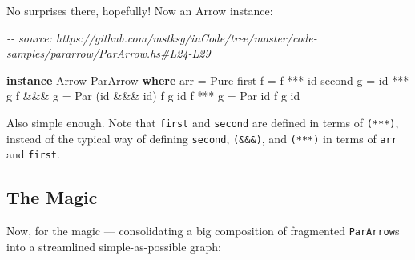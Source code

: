 \documentclass[]{article}
\newenvironment{Shaded}{}{}
\newcommand{\CommentTok}[1]{\textcolor[rgb]{0.38,0.63,0.69}{\textit{#1}}}
\newcommand{\DataTypeTok}[1]{\textcolor[rgb]{0.56,0.13,0.00}{#1}}
\newcommand{\FunctionTok}[1]{\textcolor[rgb]{0.02,0.16,0.49}{#1}}
\newcommand{\KeywordTok}[1]{\textcolor[rgb]{0.00,0.44,0.13}{\textbf{#1}}}
\newcommand{\NormalTok}[1]{#1}
\newcommand{\OperatorTok}[1]{\textcolor[rgb]{0.40,0.40,0.40}{#1}}
\newcommand{\OtherTok}[1]{\textcolor[rgb]{0.00,0.44,0.13}{#1}}
\begin{document}
No surprises there, hopefully! Now an Arrow instance:

\begin{Shaded}
\begin{Highlighting}[]
\CommentTok{{-}{-} source: https://github.com/mstksg/inCode/tree/master/code{-}samples/pararrow/ParArrow.hs\#L24{-}L29}

\KeywordTok{instance} \DataTypeTok{Arrow} \DataTypeTok{ParArrow} \KeywordTok{where}
\NormalTok{    arr      }\OtherTok{=} \DataTypeTok{Pure}
\NormalTok{    first f  }\OtherTok{=}\NormalTok{ f  }\OperatorTok{***} \FunctionTok{id}
\NormalTok{    second g }\OtherTok{=} \FunctionTok{id} \OperatorTok{***}\NormalTok{ g}
\NormalTok{    f }\OperatorTok{\&\&\&}\NormalTok{ g  }\OtherTok{=} \DataTypeTok{Par}\NormalTok{ (}\FunctionTok{id} \OperatorTok{\&\&\&} \FunctionTok{id}\NormalTok{) f g }\FunctionTok{id}
\NormalTok{    f }\OperatorTok{***}\NormalTok{ g  }\OtherTok{=} \DataTypeTok{Par} \FunctionTok{id}\NormalTok{          f g }\FunctionTok{id}
\end{Highlighting}
\end{Shaded}

Also simple enough. Note that \texttt{first} and \texttt{second} are defined in
terms of \texttt{(***)}, instead of the typical way of defining \texttt{second},
\texttt{(\&\&\&)}, and \texttt{(***)} in terms of \texttt{arr} and
\texttt{first}.

\hypertarget{the-magic}{%
\subsection{The Magic}\label{the-magic}}

Now, for the magic --- consolidating a big composition of fragmented
\texttt{ParArrow}s into a streamlined simple-as-possible graph:
\end{document}

